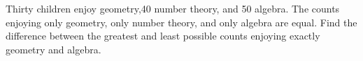 Thirty children enjoy geometry,40 number theory, and 50 algebra. The counts enjoying only geometry, only number theory, and only algebra are equal. Find the difference between the greatest and least possible counts enjoying exactly geometry and algebra.
